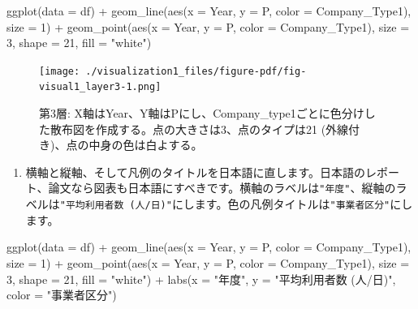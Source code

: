 \documentclass[
  a4paper,
  pandoc,
  ja=standard,
  jafont=haranoaji]{bxjsbook}
\newenvironment{Shaded}{\begin{snugshade}}{\end{snugshade}}
\newcommand{\AttributeTok}[1]{\textcolor[rgb]{0.00,0.48,0.65}{#1}}
\newcommand{\DecValTok}[1]{\textcolor[rgb]{0.68,0.00,0.00}{#1}}
\newcommand{\FunctionTok}[1]{\textcolor[rgb]{0.28,0.35,0.67}{#1}}
\newcommand{\NormalTok}[1]{\textcolor[rgb]{0.00,0.48,0.65}{#1}}
\newcommand{\SpecialCharTok}[1]{\textcolor[rgb]{0.37,0.37,0.37}{#1}}
\newcommand{\StringTok}[1]{\textcolor[rgb]{0.13,0.47,0.30}{#1}}
\providecommand{\tightlist}{%
  \setlength{\itemsep}{0pt}\setlength{\parskip}{0pt}}
\begin{document}
\begin{Shaded}
\begin{Highlighting}[numbers=left,,]
\FunctionTok{ggplot}\NormalTok{(}\AttributeTok{data =}\NormalTok{ df) }\SpecialCharTok{+}
  \FunctionTok{geom\_line}\NormalTok{(}\FunctionTok{aes}\NormalTok{(}\AttributeTok{x =}\NormalTok{ Year, }\AttributeTok{y =}\NormalTok{ P, }\AttributeTok{color =}\NormalTok{ Company\_Type1), }
            \AttributeTok{size =} \DecValTok{1}\NormalTok{) }\SpecialCharTok{+}
  \FunctionTok{geom\_point}\NormalTok{(}\FunctionTok{aes}\NormalTok{(}\AttributeTok{x =}\NormalTok{ Year, }\AttributeTok{y =}\NormalTok{ P, }\AttributeTok{color =}\NormalTok{ Company\_Type1), }
             \AttributeTok{size =} \DecValTok{3}\NormalTok{, }\AttributeTok{shape =} \DecValTok{21}\NormalTok{, }\AttributeTok{fill =} \StringTok{"white"}\NormalTok{)}
\end{Highlighting}
\end{Shaded}

\begin{figure}[H]

{\centering \texttt{[image: ./visualization1\_files/figure-pdf/fig-visual1\_layer3-1.png]}

}

\caption{\label{fig-visual1_layer3}第3層:
X軸はYear、Y軸はPにし、Company\_type1ごとに色分けした散布図を作成する。点の大きさは3、点のタイプは21
(外線付き)、点の中身の色は白よする。}

\end{figure}

\begin{enumerate}
\def\labelenumi{\arabic{enumi}.}
\setcounter{enumi}{3}
\tightlist
\item
  横軸と縦軸、そして凡例のタイトルを日本語に直します。日本語のレポート、論文なら図表も日本語にすべきです。横軸のラベルは\texttt{"年度"}、縦軸のラベルは\texttt{"平均利用者数\ (人/日)"}にします。色の凡例タイトルは\texttt{"事業者区分"}にします。
\end{enumerate}

\begin{Shaded}
\begin{Highlighting}[numbers=left,,]
\FunctionTok{ggplot}\NormalTok{(}\AttributeTok{data =}\NormalTok{ df) }\SpecialCharTok{+}
  \FunctionTok{geom\_line}\NormalTok{(}\FunctionTok{aes}\NormalTok{(}\AttributeTok{x =}\NormalTok{ Year, }\AttributeTok{y =}\NormalTok{ P, }\AttributeTok{color =}\NormalTok{ Company\_Type1), }
            \AttributeTok{size =} \DecValTok{1}\NormalTok{) }\SpecialCharTok{+}
  \FunctionTok{geom\_point}\NormalTok{(}\FunctionTok{aes}\NormalTok{(}\AttributeTok{x =}\NormalTok{ Year, }\AttributeTok{y =}\NormalTok{ P, }\AttributeTok{color =}\NormalTok{ Company\_Type1), }
             \AttributeTok{size =} \DecValTok{3}\NormalTok{, }\AttributeTok{shape =} \DecValTok{21}\NormalTok{, }\AttributeTok{fill =} \StringTok{"white"}\NormalTok{) }\SpecialCharTok{+}
  \FunctionTok{labs}\NormalTok{(}\AttributeTok{x =} \StringTok{"年度"}\NormalTok{, }\AttributeTok{y =} \StringTok{"平均利用者数 (人/日)"}\NormalTok{, }\AttributeTok{color =} \StringTok{"事業者区分"}\NormalTok{)}
\end{Highlighting}
\end{Shaded}
\end{document}
